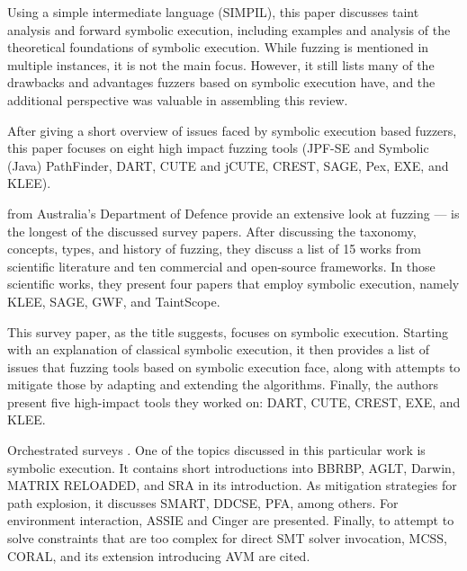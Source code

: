 \documentclass{article}
\begin{document}
\begin{multicols}{2}
    Using a simple intermediate language (SIMPIL), this paper discusses taint analysis and forward symbolic execution, including examples and analysis of the theoretical foundations of symbolic execution. While fuzzing is mentioned in multiple instances, it is not the main focus. However, it still lists many of the drawbacks and advantages fuzzers based on symbolic execution have, and the additional perspective was valuable in assembling this review.

    After giving a short overview of issues faced by symbolic execution based fuzzers, this paper focuses on eight high impact fuzzing tools (JPF-SE and Symbolic (Java) PathFinder\cite{JPFSE, JavaPathFinder}, DART\cite{DART}, CUTE\cite{CUTE} and jCUTE\cite{ExplicitPathModelChecking}, CREST\cite{CREST}, SAGE\cite{SAGE}, Pex\cite{Pex}, EXE\cite{EXE}, and KLEE\cite{KLEE}).

    \citeauthor{FuzzingTheStateOfTheArt} from Australia's Department of Defence provide an extensive look at fuzzing —  is the longest of the discussed survey papers. After discussing the taxonomy, concepts, types, and history of fuzzing, they discuss a list of 15 works from scientific literature and ten commercial and open-source frameworks. In those scientific works, they present four papers that employ symbolic execution, namely KLEE\cite{KLEE}, SAGE\cite{SAGE}, GWF\cite{GWF}, and TaintScope\cite{TaintScope}.

    This survey paper, as the title suggests, focuses on symbolic execution. Starting with an explanation of classical symbolic execution, it then provides a list of issues that fuzzing tools based on symbolic execution face, along with attempts to mitigate those by adapting and extending the algorithms. Finally, the authors present five high-impact tools they worked on: DART\cite{DART}, CUTE\cite{CUTE}, CREST\cite{CREST}, EXE\cite{EXE}, and KLEE\cite{KLEE}.

    Orchestrated surveys \cite{Orchestrated}. One of the topics discussed in this particular work is symbolic execution. It contains short introductions into BBRBP\cite{BBRBP}, AGLT\cite{AGLT}, Darwin\cite{Darwin}, MATRIX RELOADED\cite{MATRIXRELOADED}, and SRA\cite{SRA} in its introduction. As mitigation strategies for path explosion, it discusses SMART\cite{SMART}, DDCSE\cite{DDCSE}, PFA\cite{PFA}, among others. For environment interaction, ASSIE\cite{ASSIE} and Cinger\cite{Cinger} are presented. Finally, to attempt to solve constraints that are too complex for direct SMT solver invocation, MCSS\cite{MCSS}, CORAL\cite{CORAL}, and its extension introducing AVM\cite{CORALAVM} are cited.


\end{multicols}
\end{document}
